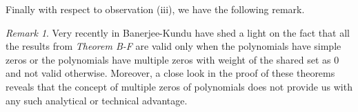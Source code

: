 \documentclass[a4paper,draft]{amsproc}
\theoremstyle{plain}
\newtheorem{ques}{Question}[section]
\theoremstyle{definition}
\theoremstyle{remark}
\newtheorem{rem}{Remark}[section]
\numberwithin{equation}{section}
\begin{document}
Finally with respect to observation (iii), we have the following remark.
\begin{rem}
	Very recently	in \cite[see paragraph between Theorem H and Theorem I]{bk1} Banerjee-Kundu have shed a light on  the fact that all the results %
	from {\em Theorem B-F} are valid only when the polynomials  have simple zeros or the polynomials have multiple zeros with weight of the shared set as $0$ and not valid otherwise. Moreover, a close look in the proof of these theorems reveals that the concept of multiple zeros of polynomials does not provide us with any such analytical or technical advantage. %
\end{rem}
\end{document}
